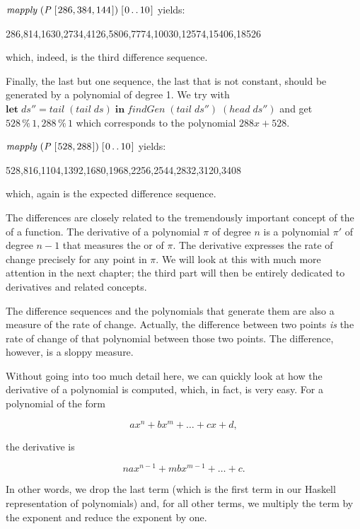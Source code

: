 \documentclass[tikz]{scrreprt}
\newcommand{\Conid}[1]{\mathit{#1}}
\newcommand{\Varid}[1]{\mathit{#1}}
\begin{document}
\ensuremath{\Varid{mapply}\;(\Conid{P}\;[\mskip1.5mu \mathrm{286},\mathrm{384},\mathrm{144}\mskip1.5mu])\;[\mskip1.5mu \mathrm{0}\mathinner{\ldotp\ldotp}\mathrm{10}\mskip1.5mu]} yields:

286,814,1630,2734,4126,5806,7774,10030,12574,15406,18526

which, indeed, is the third difference sequence.

Finally, the last but one sequence, the last
that is not constant, should be generated by a polynomial
of degree 1. We try with
\ensuremath{\mathbf{let}\;\Varid{ds''}\mathrel{=}\Varid{tail}\;(\Varid{tail}\;\Varid{ds})\;\mathbf{in}\;\Varid{findGen}\;(\Varid{tail}\;\Varid{ds''})\;(\Varid{head}\;\Varid{ds''})}
and get \ensuremath{\mathrm{528}\mathbin{\%}\mathrm{1},\mathrm{288}\mathbin{\%}\mathrm{1}}
which corresponds to the polynomial $288x + 528$.

\ensuremath{\Varid{mapply}\;(\Conid{P}\;[\mskip1.5mu \mathrm{528},\mathrm{288}\mskip1.5mu])\;[\mskip1.5mu \mathrm{0}\mathinner{\ldotp\ldotp}\mathrm{10}\mskip1.5mu]} yields:

528,816,1104,1392,1680,1968,2256,2544,2832,3120,3408

which, again is the expected difference sequence.

The differences are closely related to the tremendously
important concept of the  of a function.
The derivative of a polynomial $\pi$ of degree $n$
is a polynomial $\pi'$ of degree $n-1$ that measures
the  or  of $\pi$.
The derivative expresses the rate of change precisely
for any point in $\pi$. We will look at this with
much more attention in the next chapter; 
the third part will then be entirely dedicated 
to derivatives and
related concepts.

The difference sequences and the polynomials that generate them
are also a measure of the rate of change.
Actually, the difference between two points \emph{is}
the rate of change of that polynomial between those two points.
The difference, however, is a sloppy measure.

Without going into too much detail here,
we can quickly look at how the derivative of a polynomial
is computed, which, in fact, is very easy.
For a polynomial of the form

\[
ax^n + bx^m + \dots + cx + d,
\]

the derivative is

\[
nax^{n-1} + mbx^{m-1} + \dots + c.
\]

In other words, we drop the last term (which is the first term
in our Haskell representation of polynomials)
and, for all other terms, we multiply the term by the exponent
and reduce the exponent by one.
\end{document}
